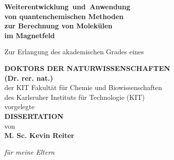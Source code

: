 \begin{titlepage}
    \begin{center}
      \begin{onehalfspace}          
        \mbox{\textbf{\huge{Weiterentwicklung und Anwendung}}}\\
        \vspace{0.4cm}
        \textbf{\huge{von quantenchemischen Methoden}}\\
        \vspace{0.4cm}
        \textbf{\huge{zur Berechnung von Molekülen}}\\ 
        \vspace{0.4cm}
        \textbf{\huge{im Magnetfeld}}
      \end{onehalfspace} 
        
        \vspace{1.5cm}
        Zur Erlangung des akademischen Grades eines
        
        \vspace{1.0cm}
        \textbf{\Large{DOKTORS DER NATURWISSENSCHAFTEN}}\\
        \vspace{1.cm}
        \textbf{\large{(Dr. rer. nat.)}}\\
        \vspace{1.5cm}
        der KIT Fakultät für Chemie und Biowissenschaften\\
        \vspace{0.5cm}
        des Karlsruher Instituts für Technologie (KIT)\\
        \vspace{0.5cm}
        vorgelegte \\
        \vspace{1.0cm}
        \textbf{\Large{DISSERTATION}}\\
        \vspace{1.0cm}
        von\\
        \vspace{1.0cm}
        \textbf{\large{M. Sc. Kevin Reiter}}\\
        
        \vfill        
    \end{center}
    
\newpage
\restoregeometry
\thispagestyle{empty}
\cleardoublepage

\newpage
\thispagestyle{empty}

\vspace*{\fill}
\begin{center}
\textit{für meine Eltern}
\end{center}
\vfill

\newpage
\thispagestyle{empty}
\cleardoublepage
\end{titlepage}